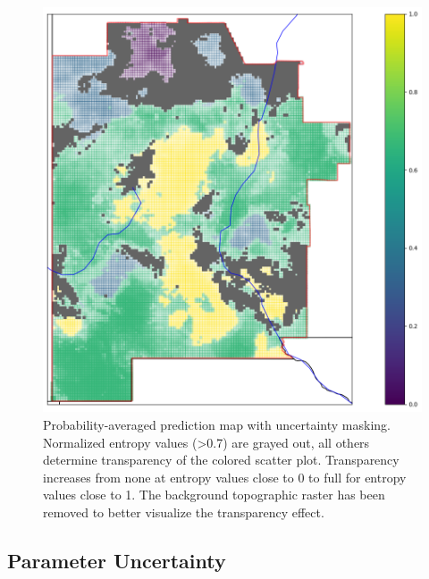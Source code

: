 \begin{figure}[!htp]
\centering
\includegraphics[width=.8\textwidth]{templates/images/Figure-Masked_Average_Gradient_Map.png}
\caption[Structural uncertainty mask on prediction map]{Probability-averaged prediction map with uncertainty masking. Normalized entropy values (>0.7) are grayed out, all others determine transparency of the colored scatter plot. Transparency increases from none at entropy values close to 0 to full for entropy values close to 1. The background topographic raster has been removed to better visualize the transparency effect.}
\label{fig:avg_gradient_masked_map}
\end{figure}

\subsection{Parameter Uncertainty} \label{ch5:param_uncertainty}


